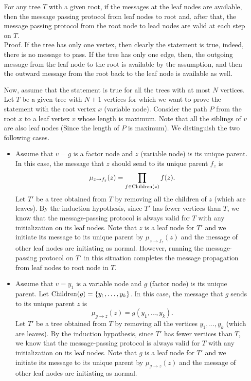 \documentclass[12pt, fullpage,letterpaper]{article}
\def\red{\color{black!30!red}}
\begin{document}
\begin{enumerate}
{{\red For any tree $T$ with a given root, if the messages at the leaf nodes are available, then the message passing protocol from leaf nodes to root and, after that,  the message passing protocol from the root node to lead nodes are valid at each step on $T$.}\\

{\red Proof. } If the tree has only one vertex, then clearly the statement is true, indeed, there is no message to pass.
If the tree has only one edge, then, the outgoing message from the leaf node to the root is available by the assumption,  
and then the outward message from the root back to the leaf node is available as well. 

Now, assume that the statement is true for all the trees with at most $N$ vertices. 
Let $T$ be a given tree with $N+1$ vertices for which we want to prove the statement with the root vertex $x$ (variable node). 
Consider the path $P$ from the root $x$ to a leaf vertex $v$ whose length is maximum. 
Note that all the siblings of $v$ are also leaf nodes (Since the length of $P$ is maximum).
We distinguish the two following cases.
\begin{itemize}
\item Assume that $v=g$ is a factor node and $z$ (variable node) is its unique parent. 
In this case, the message that $z$ should send to its unique parent $f_{z}$ is 
$$\mu_{z\rightarrow f_z}(z) = \prod_{f\in {\rm Children}(z)}f(z).$$
Let $T'$ be a tree obtained from $T$ by removing all the children of $z$ (which are leaves).
By the induction hypothesis, since $T'$ has fewer vertices than $T$, we know that the message-passing protocol is always valid for $T$ with any initialization on its leaf nodes. Note that $z$ is a leaf node for $T'$ and we initiate its message to its unique parent by $\mu_{z\rightarrow f_z}(z)$ and the message of other leaf nodes are initiating as normal.
However, running the message-passing protocol on $T'$ in this situation completes the message propagation from leaf nodes to root node in $T$. 
\item Assume that $v=y_1$ is a variable node and $g$ (factor node) is its unique parent. 
Let ${\rm Children}(g) = \{y_1,\ldots,y_k\}$. In this case, the message that $g$ sends to its unique parent $z$ is 
$$\mu_{g\rightarrow z}(z) = g(y_1,\ldots,y_k).$$
Let $T'$ be a tree obtained from $T$ by removing all the vertices $y_1,\ldots, y_k$ (which are leaves).
By the induction hypothesis, since $T'$ has fewer vertices than $T$, we know that the message-passing protocol is always valid for $T$ with any initialization on its leaf nodes. Note that $g$ is a leaf node for $T'$ and we initiate its message to its unique parent by $\mu_{g\rightarrow z}(z)$ and the message of other leaf nodes are initiating as normal.

\end{itemize}}
\end{enumerate}
\end{document}
